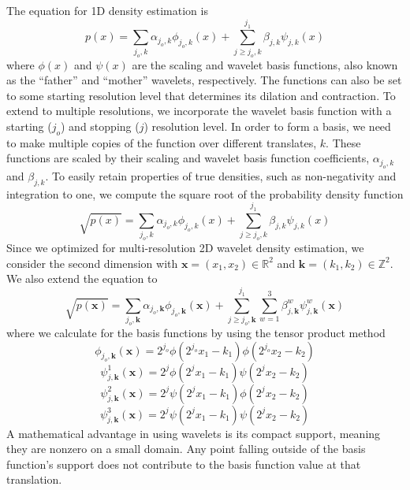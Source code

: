 \documentclass[../tech_report_1.tex]{subfiles}
\begin{document}
The equation for 1D density estimation is 
\begin{equation}
p(x)=\underset{j_{o},k}{\sum}\alpha_{j_{o},k}\phi_{j_{o},k}(x)+\underset{j\geq j_{o},k}{\overset{j_{1}}{\sum}}\beta_{j,k}\psi_{j,k}(x)\label{eq:WDE}
\end{equation}
where $\phi(x)$ and $\psi(x)$ are the scaling and wavelet basis
functions, also known as the ``father'' and ``mother'' wavelets,
respectively. The functions can also be set to some starting resolution
level that determines its dilation and contraction. To extend to multiple
resolutions, we incorporate the wavelet basis function with a starting ($j_{o}$) and stopping ($j$) resolution level. In order to form a
basis, we need to make multiple copies of the function over different
translates, $k$. These functions are scaled by their scaling and
wavelet basis function coefficients, $\alpha_{j_{o},k}$ and $\beta_{j,k}$.
To easily retain properties of true densities, such as non-negativity and
integration to one, we compute the square root of the probability
density function 
\begin{equation}
\sqrt{p(x)}=\underset{j_{o},k}{\sum}\alpha_{j_{o},k}\phi_{j_{o},k}(x)+\underset{j\geq j_{o},k}{\overset{j_{1}}{\sum}}\beta_{j,k}\psi_{j,k}(x)\label{eq:sqrtWDE}
\end{equation}
Since we optimized for multi-resolution 2D wavelet density estimation,
we consider the second dimension with $\mathbf{x}=(x_{1},x_{2})\in\mathbb{R}^{2}$
and \textbf{$\mathbf{k}=(k_{1},k_{2})\in\mathbb{Z}^{2}$}. We also
extend the equation to 
\begin{equation}
\sqrt{p(\mathbf{x})}=\underset{j_{o},\mathbf{k}}{\sum}\alpha_{j_{o},\mathbf{k}}\phi_{j_{o},\mathbf{k}}(\mathbf{x})+\underset{j\geq j_{o},\mathbf{k}}{\overset{j_{1}}{\sum}}\overset{3}{\underset{w=1}{\sum}}\beta_{j,\mathbf{k}}^{w}\psi_{j,\mathbf{k}}^{w}(\mathbf{x})\label{eq:sqrtWDE2Dmultires}
\end{equation}
where we calculate for the basis functions by using the tensor product
method 
\[
\phi_{j_{o},\mathbf{k}}(\mathbf{x})=2^{j_{o}}\phi(2^{j_{o}}x_{1}-k_{1})\phi(2^{j_{o}}x_{2}-k_{2})
\]
\[
\psi_{j,\mathbf{k}}^{1}(\mathbf{x})=2^{j}\phi(2^{j}x_{1}-k_{1})\psi(2^{j}x_{2}-k_{2})
\]
\[
\psi_{j,\mathbf{k}}^{2}(\mathbf{x})=2^{j}\psi(2^{j}x_{1}-k_{1})\phi(2^{j}x_{2}-k_{2})
\]
\begin{equation}
\psi_{j,\mathbf{k}}^{3}(\mathbf{x})=2^{j}\psi(2^{j}x_{1}-k_{1})\psi(2^{j}x_{2}-k_{2})\label{eq:multiRes2D}
\end{equation}
A mathematical advantage in using wavelets is its compact support,
meaning they are nonzero on a small domain. Any point falling outside
of the basis function's support does not contribute to the basis function
value at that translation.
\end{document}
